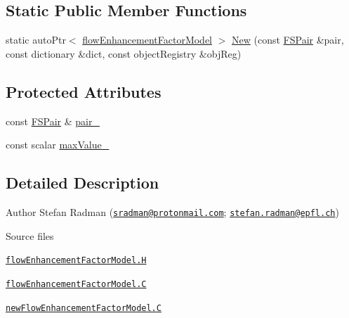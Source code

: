 \subsection*{Static Public Member Functions}
\begin{DoxyCompactItemize}
\item 
static auto\+Ptr$<$ \hyperlink{classFoam_1_1flowEnhancementFactorModel}{flow\+Enhancement\+Factor\+Model} $>$ \hyperlink{classFoam_1_1flowEnhancementFactorModel_aaefd41c8414c438fc5006a8fa0fdb238}{New} (const \hyperlink{classFoam_1_1FSPair}{F\+S\+Pair} \&pair, const dictionary \&dict, const object\+Registry \&obj\+Reg)
\end{DoxyCompactItemize}
\subsection*{Protected Attributes}
\begin{DoxyCompactItemize}
\item 
const \hyperlink{classFoam_1_1FSPair}{F\+S\+Pair} \& \hyperlink{classFoam_1_1flowEnhancementFactorModel_a587e19a1b4f4b498d2604d20c093a73b}{pair\+\_\+}
\item 
const scalar \hyperlink{classFoam_1_1flowEnhancementFactorModel_aa04cd6ffbeccc356b182712760353140}{max\+Value\+\_\+}
\end{DoxyCompactItemize}


\subsection{Detailed Description}
Author Stefan Radman (\href{mailto:sradman@protonmail.com}{\tt sradman@protonmail.\+com}; \href{mailto:stefan.radman@epfl.ch}{\tt stefan.\+radman@epfl.\+ch}) 

\label{_Description}%
 \begin{DoxyParagraph}{Source files}

\begin{DoxyItemize}
\item \href{../../../home/carlo/data/GeN-Foam/GeN-Foam_ffn/GeN-Foam/GeN-Foam/classes/thermalHydraulics/src/physicsModels/heatTransferModels/FSHeatTransferCoefficientModels/subModels/flowEnhancementFactorModels/flowEnhancementFactorModel.H}{\tt flow\+Enhancement\+Factor\+Model.\+H} 
\item \href{../../../home/carlo/data/GeN-Foam/GeN-Foam_ffn/GeN-Foam/GeN-Foam/classes/thermalHydraulics/src/physicsModels/heatTransferModels/FSHeatTransferCoefficientModels/subModels/flowEnhancementFactorModels/flowEnhancementFactorModel.C}{\tt flow\+Enhancement\+Factor\+Model.\+C} 
\item \href{../../../home/carlo/data/GeN-Foam/GeN-Foam_ffn/GeN-Foam/GeN-Foam/classes/thermalHydraulics/src/physicsModels/heatTransferModels/FSHeatTransferCoefficientModels/subModels/flowEnhancementFactorModels/newFlowEnhancementFactorModel.C}{\tt new\+Flow\+Enhancement\+Factor\+Model.\+C} 
\end{DoxyItemize}
\end{DoxyParagraph}


